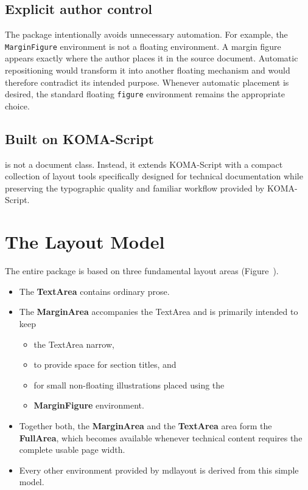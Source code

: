 \documentclass[
11pt,
a4paper,
oneside
]{scrbook}
\begin{document}
\subsection{Explicit author control}

The package intentionally avoids unnecessary automation.
For example, the \texttt{MarginFigure} environment is not a floating
environment.
A margin figure appears exactly where the author places it in the source
document.
Automatic repositioning would transform it into another floating mechanism and
would therefore contradict its intended purpose.
Whenever automatic placement is desired, the standard floating
\texttt{figure} environment remains the appropriate choice.

\subsection{Built on KOMA-Script}

\MDWordmark is not a document class.
Instead, it extends KOMA-Script with a compact collection of layout tools
specifically designed for technical documentation while preserving the
typographic quality and familiar workflow provided by KOMA-Script.

\section{The Layout Model}
\begin{widefigure}[htbp]
	\caption{Asymmetric Layout of \textbf{md}layout. This figure uses the space provided by \textbf{FullArea}}
\end{widefigure}
The entire package is based on three fundamental layout areas (Figure~).
\begin{itemize}
	\item The \textbf{TextArea} contains ordinary prose.
	\item The \textbf{MarginArea} accompanies the TextArea and is primarily intended to keep 
	\begin{itemize}
		\item the TextArea narrow, 
		\item to provide space for section titles, and 
		\item for small non-floating illustrations placed using the
		\item \textbf{MarginFigure} environment.
	\end{itemize}
	\item Together both, the \textbf{MarginArea} and the \textbf{TextArea} area form the \textbf{FullArea}, which becomes available whenever technical content requires the complete usable page width.
	\item Every other environment provided by mdlayout is derived from this simple model.
\end{itemize}
\end{document}
